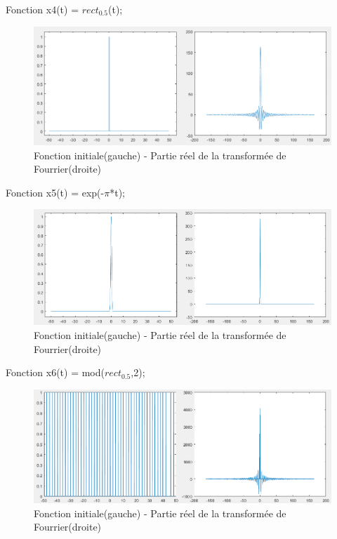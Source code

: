 \documentclass[10pt,a4paper]{article}
\begin{document}
Fonction x4(t) = \(rect_{0.5}\)(t);\\
\begin{figure}[h]
\begin{center}
\includegraphics[scale=0.7]{x4.png}
\caption{Fonction initiale(gauche) - Partie réel de la transformée de Fourrier(droite)}
\end{center}
\end{figure}

Fonction x5(t) = exp(-$\pi$*t);\\
\begin{figure}[h]
\begin{center}
\includegraphics[scale=0.7]{x5.png}
\caption{Fonction initiale(gauche) - Partie réel de la transformée de Fourrier(droite)}
\end{center}
\end{figure}

Fonction x6(t) = mod(\(rect_{0.5}\),2);\\
\begin{figure}[h]
\begin{center}
\includegraphics[scale=0.7]{x6.png}
\caption{Fonction initiale(gauche) - Partie réel de la transformée de Fourrier(droite)}
\end{center}
\end{figure}
\end{document}
